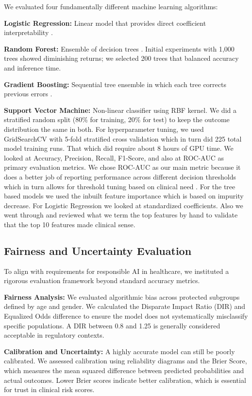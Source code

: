 \documentclass{article}
\begin{document}
We evaluated four fundamentally different machine learning algorithms:

\textbf{Logistic Regression:} Linear model that provides direct coefficient interpretability \cite{shipe2019,katzman2024}.

\textbf{Random Forest:} Ensemble of decision trees \cite{naik2025}. Initial experiments with 1,000 trees showed diminishing returns; we selected 200 trees that balanced accuracy and inference time.

\textbf{Gradient Boosting:} Sequential tree ensemble in which each tree corrects previous errors \cite{naik2025,yue2024}.

\textbf{Support Vector Machine:} Non-linear classifier using RBF kernel. We did a stratified random split (80\% for training, 20\% for test) to keep the outcome distribution the same in both. For hyperparameter tuning, we used GridSearchCV with 5-fold stratified cross validation which in turn did 225 total model training runs. That which did require about 8 hours of GPU time. We looked at Accuracy, Precision, Recall, F1-Score, and also at ROC-AUC as primary evaluation metrics. We chose ROC-AUC as our main metric because it does a better job of reporting performance across different decision thresholds which in turn allows for threshold tuning based on clinical need \cite{bourdes2020}. For the tree based models we used the inbuilt feature importance which is based on impurity decrease. For Logistic Regression we looked at standardized coefficients. Also we went through and reviewed what we term the top features by hand to validate that the top 10 features made clinical sense.

\subsection{Fairness and Uncertainty Evaluation}\label{subsec:fairness}

To align with requirements for responsible AI in healthcare, we instituted a rigorous evaluation framework beyond standard accuracy metrics.

\textbf{Fairness Analysis:} We evaluated algorithmic bias across protected subgroups defined by age and gender. We calculated the Disparate Impact Ratio (DIR) and Equalized Odds difference to ensure the model does not systematically misclassify specific populations. A DIR between 0.8 and 1.25 is generally considered acceptable in regulatory contexts.

\textbf{Calibration and Uncertainty:} A highly accurate model can still be poorly calibrated. We assessed calibration using reliability diagrams and the Brier Score, which measures the mean squared difference between predicted probabilities and actual outcomes. Lower Brier scores indicate better calibration, which is essential for trust in clinical risk scores.
\end{document}
